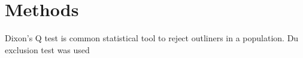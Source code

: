 \chapter{Methods}

Dixon's Q test is common statistical tool to reject outliners in a population. Du exclusion test was used 